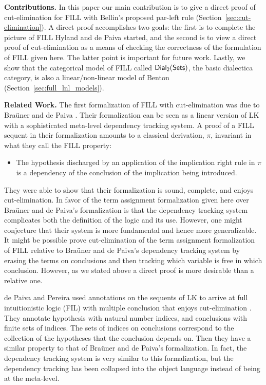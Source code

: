 \textbf{Contributions.} In this paper our main contribution is to give
a direct proof of cut-elimination for FILL with Bellin's proposed
par-left rule (Section~\ref{sec:cut-elimination}).  A direct proof
accomplishes two goals: the first is to complete the picture of FILL
Hyland and de Paiva started, and the second is to view a direct proof
of cut-elimination as a means of checking the correctness of the
formulation of FILL given here.  The latter point is important for
future work.  Lastly, we show that the categorical model of FILL
called $\mathsf{Dial_2}(\mathsf{Sets})$, the basic dialectica category, is also a
linear/non-linear model of Benton (Section~\ref{sec:full_lnl_models}).

\textbf{Related Work.} The first formalization of FILL with
cut-elimination was due to Bra\"uner and de Paiva \cite{Brauner:1998}.
Their formalization can be seen as a linear version of LK with a
sophisticated meta-level dependency tracking system.  A proof of a
FILL sequent in their formalization amounts to a classical derivation,
$\pi$, invariant in what they call the FILL property:
\begin{center}
  \begin{itemize}
  \item The hypothesis discharged by an application of the implication
    right rule in $\pi$ is a dependency of the conclusion of the
    implication being introduced.
  \end{itemize}
\end{center}
They were able to show that their formalization is sound, complete,
and enjoys cut-elimination.  In favor of the term assignment
formalization given here over Bra\"uner and de Paiva's formalization
is that the dependency tracking system complicates both the definition
of the logic and its use.  However, one might conjecture that their
system is more fundamental and hence more generalizable.  It might be
possible prove cut-elimination of the term assignment formalization of
FILL relative to Bra\"uner and de Paiva's dependency tracking system
by erasing the terms on conclusions and then tracking which variable
is free in which conclusion.  However, as we stated above a direct
proof is more desirable than a relative one.

de Paiva and Pereira used annotations on the sequents of LK to arrive
at full intuitionistic logic (FIL) with multiple conclusion that
enjoys cut-elimination \cite{dePaiva:2005}. They annotate hypothesis
with natural number indices, and conclusions with finite sets of
indices.  The sets of indices on conclusions correspond to the
collection of the hypotheses that the conclusion depends on.  Then
they have a similar property to that of Bra\"uner and de Paiva's
formalization.  In fact, the dependency tracking system is very
similar to this formalization, but the dependency tracking has been
collapsed into the object language instead of being at the meta-level.

